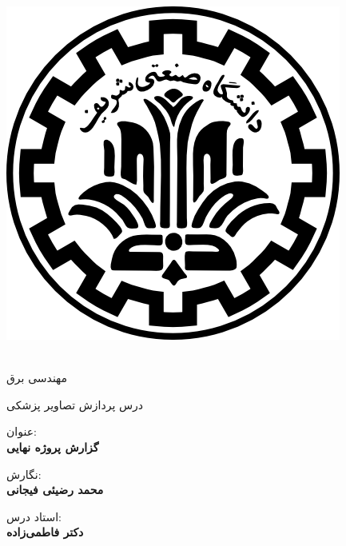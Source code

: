 
\pagestyle{empty}

\begin{center}

\includegraphics[scale=0.2]{front/template/images/logo.png}

\begin{large}

\vspace{-0.2cm}
\ThesisUniversity \\[-0.3em]
مهندسی برق

\vspace{0.5cm}

درس پردازش تصاویر پزشکی

\end{large}

\vspace{1cm}

{عنوان:}\\[1.2em]
{\LARGE\textbf{گزارش پروژه نهایی}}

\vspace{1cm}

{نگارش:}\\[.5em]
{\large\textbf{محمد رضیئی فیجانی}}

\vspace{0.7cm}

{استاد درس:}\\[.5em]
{\large\textbf{دکتر فاطمی‌زاده}}

\vspace{1.3cm}

\ThesisDate

\end{center}

\newpage
